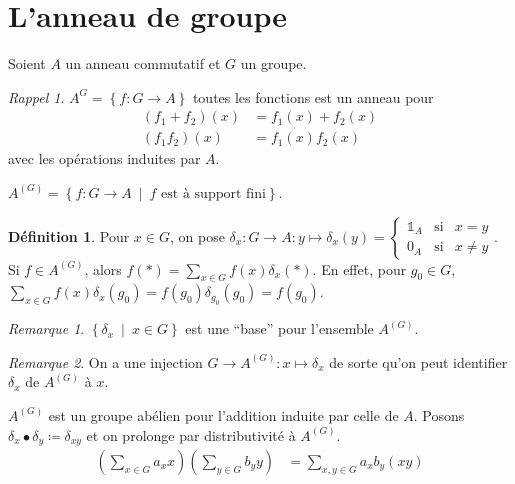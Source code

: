 \documentclass{report}
\theoremstyle{definition}
\newtheorem*{dfn}{D\'efinition}
\theoremstyle{remark}
\newtheorem*{rmq}{Remarque}
\newtheorem*{rapp}{Rappel}
\def\id{\mathds{1}}
\begin{document}
	\section{L'anneau de groupe}
	Soient $A$ un anneau commutatif et $G$ un groupe.

	\begin{rapp}
		$A^G = \left\{ f:G \to A \right\}$ toutes les fonctions est un anneau pour
		\begin{align*}
			(f_1+f_2)(x)&= f_1(x)+f_2(x)\\
			(f_1f_2)(x)&= f_1(x)f_2(x)
		\end{align*}
		avec les op\'erations induites par $A$.

		$A^{(G)} = \left\{ f:G \to A ~\middle|~ f\text{ est \`a support fini} \right\}$.
	\end{rapp}

	\begin{dfn}
		Pour $x \in G$, on pose $\delta_x : G \to A : y \mapsto \delta_x(y) = \left\{ \begin{array}{lll}
			\id_A&\text{si}&x=y\\
			0_A&\text{si}&x\neq y
		\end{array} \right.$. Si $f \in A^{(G)}$, alors $f(*) = \sum_{x \in G} f(x) \delta_x(*)$. En effet, pour $g_0 \in G$, $\sum_{x \in G} f(x) \delta_x(g_0) = f(g_0)\delta_{g_0}(g_0) = f(g_0)$.
	\end{dfn}

	\begin{rmq}
		$\left\{ \delta_x ~\middle|~ x \in G \right\}$ est une ``base'' pour l'ensemble $A^{(G)}$.
	\end{rmq}

	\begin{rmq}
		On a une injection $G \to A^{(G)} : x \mapsto \delta_x$ de sorte qu'on peut identifier $\delta_x$ de $A^{(G)}$ \`a $x$.
	\end{rmq}

	$A^{(G)}$ est un groupe ab\'elien pour l'addition induite par celle de $A$. Posons $\delta_x\bullet\delta_y \coloneq \delta_{xy}$ et on prolonge par distributivit\'e \`a $A^{(G)}$.
	\begin{align*}
		\left( \sum_{x \in G} a_xx \right) \left( \sum_{y \in G} b_yy \right)&= \sum_{x,y \in G} a_xb_y(xy)
	\end{align*}
\end{document}
